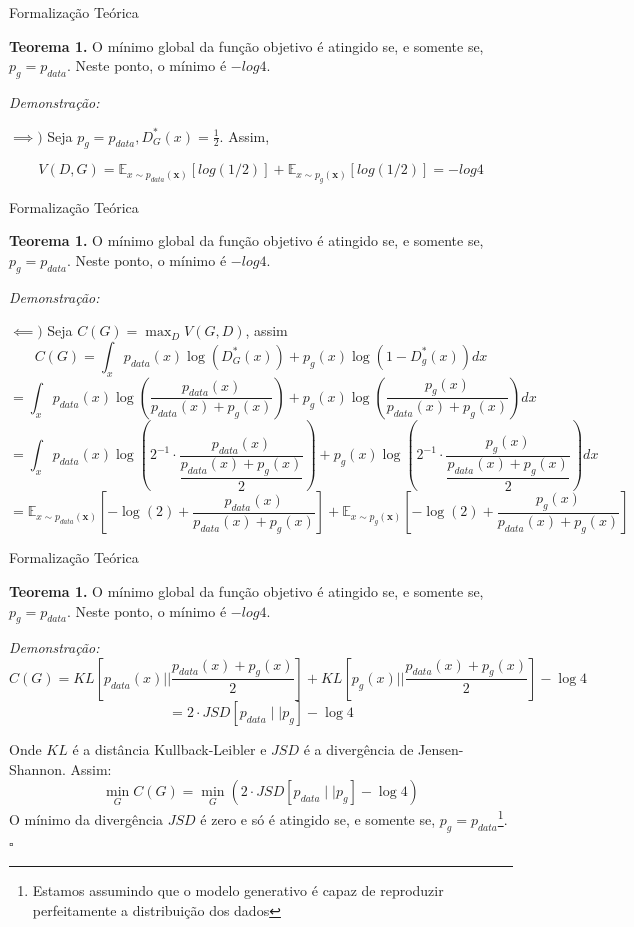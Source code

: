 \documentclass[10pt]{beamer}
\newcommand*{\QEDB}{\hfill\ensuremath{\square}}%
\begin{document}
\begin{frame}[fragile]{Formalização Teórica}

	\textbf{Teorema 1.} O mínimo global da função objetivo
	é atingido se, e somente se, $p_g = p_{data}$. Neste ponto,
	o mínimo é $-log4$.

	\textit{Demonstração:}

	$
	\implies )$
	Seja $p_g = p_{data}, D^*_G(x) = \frac{1}{2}$. Assim,

  $$V(D,G)=
    \mathbb{E}_{x\sim p_{data}(\bm x)}\left[log (1/2) \right]+
    \mathbb{E}_{x\sim p_g(\bm x)}\left[log(1/2)\right] =  -log4
  $$


\end{frame}

\begin{frame}[fragile]{Formalização Teórica}

\small
	\textbf{Teorema 1.} O mínimo global da função objetivo
	é atingido se, e somente se, $p_g = p_{data}$. Neste ponto,
	o mínimo é $-log4$.

	\textit{Demonstração:}

	$
	\impliedby )$ Seja $C(G) = \max_{D}V(G,D)$, assim
  $$C(G) = \int_{x}p_{data}(x)\log{\left(D_{G}^{*}(x)\right)}
  + p_{g}(x)\log{\left(1-D_{g}^{*}(x)\right)}dx $$
  \pause
  $$
  = \int_{x}p_{data}(x)\log{\left(\dfrac{p_{data}(x)}{p_{data}(x)
  + p_{g}(x)}\right)} + p_{g}(x)\log{\left(\dfrac{p_{g}(x)}{p_{data}(x)
  + p_{g}(x)}\right)}dx $$
  \pause
  $$= \int_{x}p_{data}(x)
  \log{\left(2^{-1}\cdot \dfrac{p_{data}(x)}{\dfrac{p_{data}(x)
  + p_{g}(x)}{2}}\right)} + p_{g}(x)
  \log{\left(2^{-1}\cdot \dfrac{p_{g}(x)}{\dfrac{p_{data}(x)
  + p_{g}(x)}{2}}\right)}dx	$$
  \pause
  $$=
    \mathbb{E}_{x\sim p_{data}(\bm x)}\left[-\log (2)+
    \frac{p_{data}(x)}{p_{data}(x)+p_g(x)}\right]+
    \mathbb{E}_{x\sim p_g(\bm x)}\left[-\log(2)+
    \frac{p_{g}(x)}{p_{data}(x)+p_g(x)}\right]
  $$

\end{frame}

\begin{frame}[fragile]{Formalização Teórica}

\small
	\textbf{Teorema 1.} O mínimo global da função objetivo
	é atingido se, e somente se, $p_g = p_{data}$. Neste ponto,
	o mínimo é $-log4$.

	\textit{Demonstração:}
  $$C(G) = KL\left[p_{data}(x)||\dfrac{p_{data}(x)+p_g(x)}{2}\right] + KL\left[p_g(x)||\dfrac{p_{data}(x) + p_g(x)}{2}\right] - \log{4} $$
  $$= 2 \cdot JSD\left[ p_{data} \mid \mid p_g
  \right] - \log 4$$

  Onde $KL$ é a distância Kullback-Leibler e $JSD$ é a divergência
  de Jensen-Shannon. Assim:
  $$\min_G C(G) = \min_G \left( 2 \cdot JSD\left[ p_{data} \mid \mid p_g
  \right] - \log 4 \right)$$
  O mínimo da divergência $JSD$ é zero e só é atingido se, e somente se,
  $p_g = p_{data}$\footnote{Estamos assumindo que o modelo
  generativo é capaz de reproduzir perfeitamente a distribuição dos
  dados}. \QEDB
\end{frame}
\end{document}
